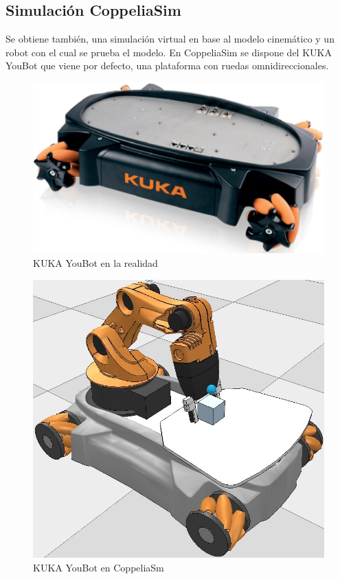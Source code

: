\documentclass[conference]{IEEEtran}
\begin{document}
\subsection{Simulación CoppeliaSim}
Se obtiene también, una simulación virtual en base al modelo cinemático y un robot con el cual se prueba el modelo.
En CoppeliaSim se dispone del KUKA YouBot que viene por defecto, una plataforma con ruedas omnidireccionales.

\begin{figure}
  \includegraphics[width=\linewidth]{figures/kuka_real_youbot.jpg}
  \caption{KUKA YouBot en la realidad}
  \label{fig:kukayoubot}
\end{figure}

\begin{figure}
  \includegraphics[width=\linewidth]{figures/kuka_sim_youbot.jpg}
  \caption{KUKA YouBot en CoppeliaSm}
  \label{fig:kukasimyoubot}
\end{figure}
\end{document}
